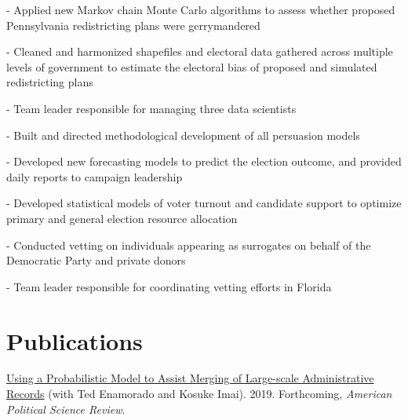 \documentclass[]{deedy-resume-openfont}
\begin{document}
\begin{tightemize}
\item[-] Applied new Markov chain Monte Carlo algorithms to assess whether proposed Pennsylvania redistricting plans were gerrymandered
\item[-] Cleaned and harmonized shapefiles and electoral data gathered across multiple levels of government to estimate the electoral bias of proposed and simulated redistricting plans
\end{tightemize}
\sectionsep

\begin{tightemize}
\item[-] Team leader responsible for managing three data scientists
\item[-] Built and directed methodological development of all persuasion models
\item[-] Developed new forecasting models to predict the election outcome, and provided daily reports to campaign leadership
\item[-] Developed statistical models of voter turnout and candidate support to optimize primary and general election resource allocation
\end{tightemize}
\sectionsep

\begin{tightemize}
\item[-] Conducted vetting on individuals appearing as surrogates on behalf of the Democratic Party and private donors
\item[-] Team leader responsible for coordinating vetting efforts in Florida
\end{tightemize}
\sectionsep

\section{Publications}
\href{https://imai.fas.harvard.edu/research/linkage.html}{Using a Probabilistic Model to Assist Merging of Large-scale Administrative Records} (with Ted Enamorado and Kosuke Imai). 2019. Forthcoming, \textit{American Political Science Review}.\\\vspace{2mm}
\end{document}
